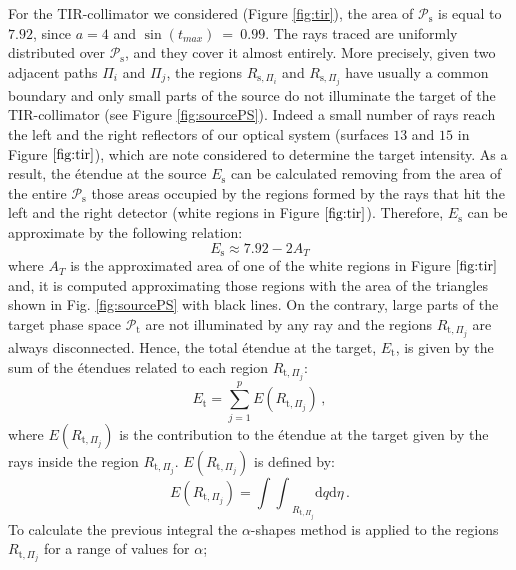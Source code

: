 \indent
 For the TIR-collimator we considered (Figure \ref{fig:tir}), the area of $\mathcal{P}_\textrm{s}$ is equal to $7.92$, since $a = 4$ and $\sin(t_{max}) ~=~ 0.99$.
 The rays traced are uniformly distributed over $\mathcal{P}_\textrm{s}$, and they cover it almost entirely.
 More precisely, given two adjacent paths $\Pi_i$ and $\Pi_j$, the regions $R_{\textrm{s}, \Pi_i}$ and $R_{\textrm{s}, \Pi_j}$ have usually a common boundary and only small parts of the source do not illuminate the target of the TIR-collimator (see Figure \ref{fig:sourcePS}).
 Indeed a small number of rays reach the left and the right reflectors of our optical system (surfaces $13$ and $15$ in Figure $\ref{fig:tir}$), which are note considered to determine the target intensity.
 As a result, the \'{e}tendue at the source $E_{\textrm{s}}$ can be calculated removing from the area of the entire $\mathcal{P}_\textrm{s}$ those areas occupied by the regions formed by the rays that hit the left and the right detector (white regions in Figure $\ref{fig:tir}$).  Therefore, $E_{\textrm{s}}$ can be approximate by the following relation:
 \begin{equation}
 E_{\textrm{s}}\approx 7.92-2A_{T}
 \end{equation}
 where $A_{T}$ is the approximated area of one of the white regions in Figure $\ref{fig:tir}$ and, it is computed approximating those regions with the area of the triangles shown in Fig. \ref{fig:sourcePS} with black lines.
 On the contrary, large parts of the target phase space $\mathcal{P}_{\textrm{t}}$ are not illuminated by any ray and the regions $R_{\textrm{t}, \Pi_j}$ are always disconnected. Hence, the total \'{e}tendue at the target, $E_{\textrm{t}}$, is given by the sum of the \'{e}tendues related to each region $R_{\textrm{t}, \Pi_{j}}$:
 \begin{equation}
 E_{\textrm{t}} = \sum_{j = 1}^p E(R_{\textrm{t}, \Pi_j})\,,
 \end{equation}
 where $E(R_{\textrm{t}, \Pi_j})$ is the contribution to the \'{e}tendue at the target given by the rays inside the region $R_{\textrm{t}, \Pi_j}$. $E(R_{\textrm{t}, \Pi_j})$ is defined by:
  \begin{equation}\label{etenduepartial}
 E(R_{\textrm{t}, \Pi_j}) = {\int\!\!\int}_{R_{\textrm{t}, \Pi_j}} \textrm{d}q\textrm{d}\eta \,.
 \end{equation}
 To calculate the previous integral the $\alpha$-shapes method is applied to the regions
  $R_{\textrm{t},\Pi_j}$ for a range of values for $\alpha$;
